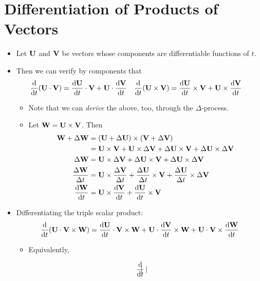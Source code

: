 \documentclass[../main.tex]{subfiles}
\begin{document}
\section{Differentiation of Products of Vectors}
\begin{itemize}
    \item Let $\vb{U}$ and $\vb{V}$ be vectors whose components are differentiable functions of $t$.
    \item Then we can verify by components that
    \begin{align*}
        \dv{t}(\vb{U}\cdot\vb{V}) &= \dv{\vb{U}}{t}\cdot\vb{V}+\vb{U}\cdot\dv{\vb{V}}{t}&
            \dv{t}(\vb{U}\times\vb{V}) &= \dv{\vb{U}}{t}\times\vb{V}+\vb{U}\times\dv{\vb{V}}{t}
    \end{align*}
    \begin{itemize}
        \item Note that we can \emph{derive} the above, too, through the $\Delta$-process.
        \item Let $\vb{W}=\vb{U}\times\vb{V}$. Then
        \begin{align*}
            \vb{W}+\Delta\vb{W} &= (\vb{U}+\Delta\vb{U})\times(\vb{V}+\Delta\vb{V})\\
            &= \vb{U}\times\vb{V}+\vb{U}\times\Delta\vb{V}+\Delta\vb{U}\times\vb{V}+\Delta\vb{U}\times\Delta\vb{V}\\
            \Delta\vb{W} &= \vb{U}\times\Delta\vb{V}+\Delta\vb{U}\times\vb{V}+\Delta\vb{U}\times\Delta\vb{V}\\
            \frac{\Delta \vb{W}}{\Delta t} &= \vb{U}\times\frac{\Delta \vb{V}}{\Delta t}+\frac{\Delta \vb{U}}{\Delta t}\times\vb{V}+\frac{\Delta \vb{U}}{\Delta t}\times\Delta\vb{V}\\
            \dv{\vb{W}}{t} &= \vb{U}\times\dv{\vb{V}}{t}+\dv{\vb{U}}{t}\times\vb{V}
        \end{align*}
    \end{itemize}
    \item Differentiating the triple scalar product:
    \begin{equation*}
        \dv{t}(\vb{U}\cdot\vb{V}\times\vb{W}) = \dv{\vb{U}}{t}\cdot\vb{V}\times\vb{W}+\vb{U}\cdot\dv{\vb{V}}{t}\times\vb{W}+\vb{U}\cdot\vb{V}\times\dv{\vb{W}}{t}
    \end{equation*}
    \begin{itemize}
        \item Equivalently,
    \end{itemize}
    \begin{equation*}
        \dv{t}
        \begin{vmatrix}

\end{vmatrix}
\end{equation*}
\end{itemize}
\end{document}
